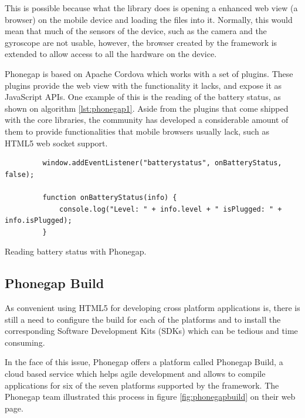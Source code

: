 This is possible because what the library does is opening a enhanced web view (a browser) on the mobile device and loading the files into it. Normally, this would mean that much of the sensors of the device, such as the camera and the gyroscope are not usable, however, the browser created by the framework is extended to allow access to all the hardware on the device.

Phonegap is based on Apache Cordova\cite{apachecordova} which works with a set of plugins. These plugins provide the web view with the functionality it lacks, and expose it as JavaScript APIs. One example of this is the reading of the battery status, as shown on algorithm \ref{lst:phonegap1}. Aside from the plugins that come shipped with the core libraries, the community has developed a considerable amount of them to provide functionalities that mobile browsers usually lack, such as HTML5 web socket support.

\begin{listing}\centering
  \begin{minipage}{.8\textwidth}
    \begin{verbatim}
	     window.addEventListener("batterystatus", onBatteryStatus, false);
	     
	     function onBatteryStatus(info) {
	         console.log("Level: " + info.level + " isPlugged: " + info.isPlugged);
	     }
    \end{verbatim}
  \end{minipage}
  \caption{Reading battery status with Phonegap.}\label{lst:phonegap1}
\end{listing}

\subsection*{Phonegap Build}

As convenient using HTML5 for developing cross platform applications is, there is still a need to configure the build for each of the platforms and to install the corresponding Software Development Kits (SDKs) which can be tedious and time consuming.

In the face of this issue, Phonegap offers a platform called Phonegap Build, a cloud based service which helps agile development and allows to compile applications for six of the seven platforms supported by the framework. The Phonegap team illustrated this process in figure \ref{fig:phonegapbuild} on their web page.

